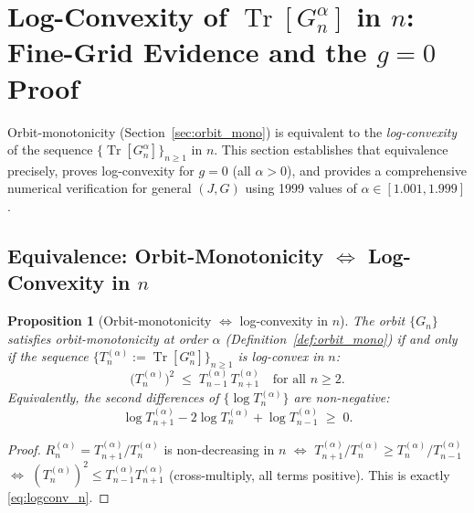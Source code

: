 \documentclass[12pt,a4paper]{article}
\newtheorem{proposition}[theorem]{Proposition}
\begin{document}
\section{Log-Convexity of $\operatorname{Tr}[G_n^\alpha]$ in $n$:
  Fine-Grid Evidence and the $g=0$ Proof}
\label{sec:logconv_n}

Orbit-monotonicity (Section~\ref{sec:orbit_mono}) is equivalent to the
\emph{log-convexity} of the sequence $\{\operatorname{Tr}[G_n^\alpha]\}_{n\geq 1}$ in $n$.
This section establishes that equivalence precisely, proves log-convexity for $g=0$
(all $\alpha>0$), and provides a comprehensive numerical verification for general
$(J,G)$ using 1999 values of $\alpha\in[1.001,1.999]$.

\subsection{Equivalence: Orbit-Monotonicity $\Leftrightarrow$ Log-Convexity in $n$}
\label{sec:om_equiv}

\begin{proposition}[Orbit-monotonicity $\Leftrightarrow$ log-convexity in $n$]
\label{prop:om_logconv_n}
The orbit $\{G_n\}$ satisfies orbit-monotonicity at order $\alpha$ (Definition~\ref{def:orbit_mono})
if and only if the sequence $\{T_n^{(\alpha)}:=\operatorname{Tr}[G_n^\alpha]\}_{n\geq 1}$
is log-convex in $n$:
\begin{equation}
\label{eq:logconv_n}
  \bigl(T_n^{(\alpha)}\bigr)^2 \;\leq\; T_{n-1}^{(\alpha)}\,T_{n+1}^{(\alpha)}
  \quad\text{for all }n\geq 2.
\end{equation}
Equivalently, the second differences of $\{\log T_n^{(\alpha)}\}$ are non-negative:
\[
  \log T_{n+1}^{(\alpha)} - 2\log T_n^{(\alpha)} + \log T_{n-1}^{(\alpha)} \;\geq\; 0.
\]
\end{proposition}

\begin{proof}
$R_n^{(\alpha)}=T_{n+1}^{(\alpha)}/T_n^{(\alpha)}$ is non-decreasing in $n$
$\Leftrightarrow$
$T_{n+1}^{(\alpha)}/T_n^{(\alpha)}\geq T_n^{(\alpha)}/T_{n-1}^{(\alpha)}$
$\Leftrightarrow$
$(T_n^{(\alpha)})^2\leq T_{n-1}^{(\alpha)}T_{n+1}^{(\alpha)}$ (cross-multiply, all terms positive).
This is exactly \eqref{eq:logconv_n}.
\end{proof}
\end{document}

